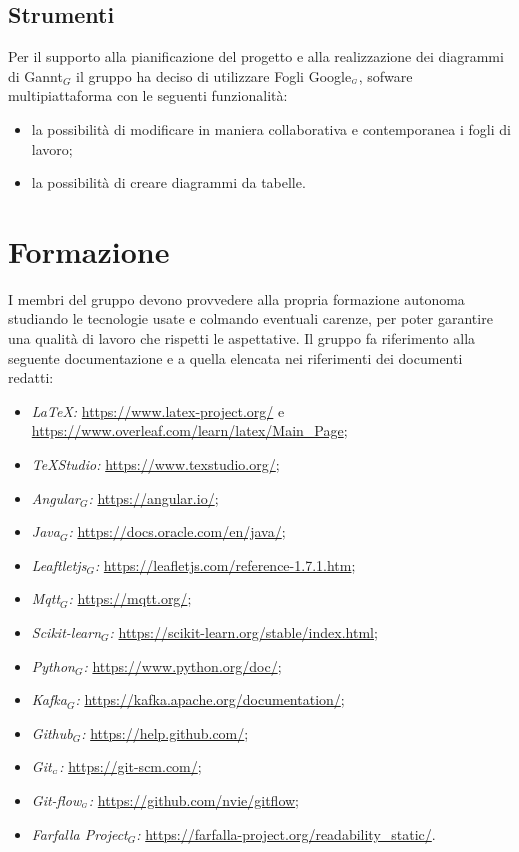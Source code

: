 \subsection{Strumenti}\label{ProcessiOrganizzativiProcessoDiPianificazioneStrumenti}
Per il supporto alla pianificazione del progetto e alla realizzazione dei diagrammi di Gannt$_G$ il gruppo ha deciso di utilizzare Fogli Google$_{\scaleto{G}{3pt}}$, sofware multipiattaforma con le seguenti funzionalità:
\begin{itemize}
	\item la possibilità di modificare in maniera collaborativa e contemporanea i fogli di lavoro;
	\item la possibilità di creare diagrammi da tabelle.
\end{itemize}
\section{Formazione}\label{ProcessiOrganizzativiFormazione}
I membri del gruppo devono provvedere alla propria formazione autonoma studiando le tecnologie usate e colmando eventuali carenze, per poter garantire una qualità di lavoro che rispetti le aspettative. Il gruppo fa riferimento alla seguente documentazione e a quella elencata nei riferimenti dei documenti redatti:
\begin{itemize}
	\item \textit{\LaTeX:} \url{https://www.latex-project.org/} e \url{https://www.overleaf.com/learn/latex/Main_Page};
	\item \textit{\TeX Studio:} \url{https://www.texstudio.org/};
	\item \textit{Angular$_G$:} \url{https://angular.io/};
	\item \textit{Java$_G$:} \url{https://docs.oracle.com/en/java/};
	\item \textit{Leaftletjs$_G$:} \url{https://leafletjs.com/reference-1.7.1.htm};
	\item \textit{Mqtt$_G$:} \url{https://mqtt.org/};
	\item \textit{Scikit-learn$_G$:} \url{https://scikit-learn.org/stable/index.html};
	\item \textit{Python$_G$:} \url{https://www.python.org/doc/};
	\item \textit{Kafka$_G$:} \url{https://kafka.apache.org/documentation/};
	\item \textit{Github$_G$:} \url{https://help.github.com/};
	\item \textit{Git$_{\scaleto{G}{3pt}}$:} \url{https://git-scm.com/};
	\item \textit{Git-flow$_{\scaleto{G}{3pt}}$:} \url{https://github.com/nvie/gitflow};
	\item \textit{Farfalla Project$_G$:} \url{https://farfalla-project.org/readability_static/}.
\end{itemize}